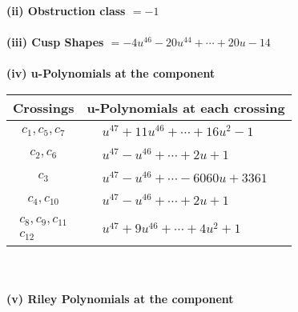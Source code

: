 \documentclass[1p]{elsarticle_modified}
\theoremstyle{definition}
\begin{document}
\flushleft \textbf{(ii) Obstruction class $= -1$}\\~\\
\flushleft \textbf{(iii) Cusp Shapes $= -4 u^{46}-20 u^{44}+\cdots+20 u-14$}\\~\\
\newpage\renewcommand{\arraystretch}{1}
\flushleft \textbf{(iv) u-Polynomials at the component}\newline \\
\begin{tabular}{m{50pt}|m{274pt}}
Crossings & \hspace{64pt}u-Polynomials at each crossing \\
\hline $$\begin{aligned}c_{1},c_{5},c_{7}\end{aligned}$$&$\begin{aligned}
&u^{47}+11 u^{46}+\cdots+16 u^2-1
\end{aligned}$\\
\hline $$\begin{aligned}c_{2},c_{6}\end{aligned}$$&$\begin{aligned}
&u^{47}- u^{46}+\cdots+2 u+1
\end{aligned}$\\
\hline $$\begin{aligned}c_{3}\end{aligned}$$&$\begin{aligned}
&u^{47}- u^{46}+\cdots-6060 u+3361
\end{aligned}$\\
\hline $$\begin{aligned}c_{4},c_{10}\end{aligned}$$&$\begin{aligned}
&u^{47}- u^{46}+\cdots+2 u+1
\end{aligned}$\\
\hline $$\begin{aligned}c_{8},c_{9},c_{11}\\c_{12}\end{aligned}$$&$\begin{aligned}
&u^{47}+9 u^{46}+\cdots+4 u^2+1
\end{aligned}$\\
\hline
\end{tabular}\\~\\
\newpage\renewcommand{\arraystretch}{1}
\flushleft \textbf{(v) Riley Polynomials at the component}\newline \\
\end{document}
